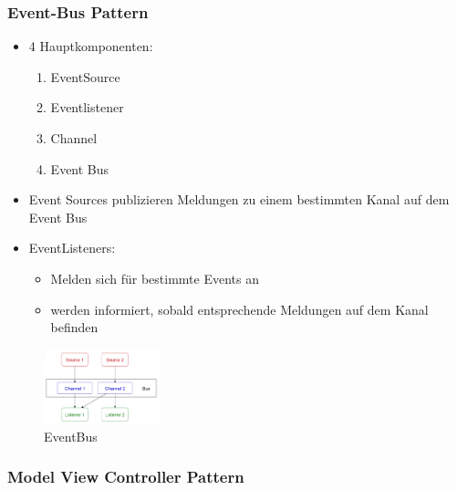 \documentclass[../ZF_SWEN1.tex]{subfiles}
\begin{document}
\subsubsection{Event-Bus Pattern}
\begin{multicols}{2}
	\begin{itemize}
		\item 4 Hauptkomponenten:
		\begin{enumerate}
			\item EventSource
			\item Eventlistener
			\item Channel
			\item Event Bus
		\end{enumerate}
		\item \colorbox{blue!30}{Event Sources} publizieren Meldungen zu einem bestimmten \colorbox{blue!30}{Kanal} auf dem \colorbox{blue!30}{Event Bus}
		\item \colorbox{blue!30}{EventListeners:}
		\begin{itemize}
			\item Melden sich für bestimmte Events an
			\item werden informiert, sobald entsprechende Meldungen auf dem \colorbox{blue!30}{Kanal} befinden
		\end{itemize}
	\end{itemize}
\columnbreak

\begin{figure}[H]			\includegraphics[width=0.3\textwidth] {Resources/Images/EventBus.png}
\caption{\label{fig:EventBus}EventBus}
\end{figure}

\end{multicols}

\pagebreak

\subsubsection{Model View Controller Pattern}
\end{document}

